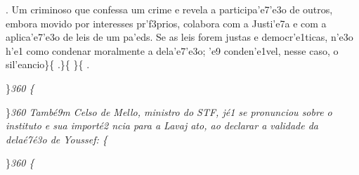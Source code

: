 \ltrch{}  . Um criminoso que
confessa um crime e revela a participa'e7'e3o de outros, embora movido
por interesses pr'f3prios, colabora com a Justi'e7a e com a
aplica'e7'e3o de leis de um pa'eds. Se as leis forem justas e
democr'e1ticas, n'e3o h'e1 como condenar moralmente a dela'e7'e3o; 'e9
conden'e1vel, nesse caso, o sil'eancio\}\{\rtlch{} 
\ltrch{}  .\}\{\rtlch{} 
\ltrch{} \super{} \}\{\rtlch{}
 \ltrch{}  .
\par \}\pard \ltrpar\qj {}\sl360\widctlpar\wrapdefault\faauto{} {\rtlch{}  \ltrch{}  \tab }\{\rtlch{}
 \ltrch{} 
\par \}\pard \ltrpar\qj {}\sl360\widctlpar\wrapdefault\faauto{} {\rtlch{}  \ltrch{}  Tamb\'e9m Celso de Mello, ministro do STF, j\'e1
 se pronunciou sobre o instituto e sua import\'e2}{\rtlch{}  \ltrch{}  ncia para a Lavaj}{\rtlch{}  \ltrch{}  ato, ao declarar a validade da dela\'e7\'e3o de Youssef: }\{\rtlch{}
 \ltrch{} 
\par \}\pard \ltrpar\qj {}\sl360\widctlpar\wrapdefault\faauto{} \{\rtlch{}
 \ltrch{} 
